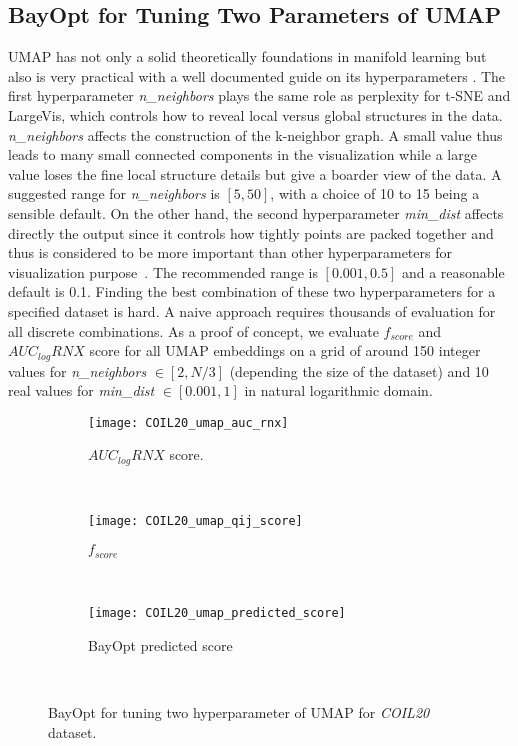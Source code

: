 \subsection{BayOpt for Tuning Two Parameters of UMAP}\label{sec:result:bo:umap}

UMAP has not only a solid theoretically foundations in manifold learning but also is very practical with a well documented guide on its hyperparameters \cite{mcinnes2018umap-software}.
The first hyperparameter \emph{n\_neighbors} plays the same role as perplexity for t-SNE and LargeVis, which controls how to reveal local versus global structures in the data.
\emph{n\_neighbors} affects the construction of the k-neighbor graph.
A small value thus leads to many small connected components in the visualization while a large value loses the fine local structure details but give a boarder view of the data.
A suggested range for \emph{n\_neighbors} is $[5, 50]$, with a choice of 10 to 15 being a sensible default.
On the other hand, the second hyperparameter \emph{min\_dist} affects directly the output since it controls how tightly points are packed together and thus is considered to be more important than other hyperparameters for visualization purpose~\cite[Sec.4.3]{mcinnes2018umap}.
The recommended range is $[0.001, 0.5]$ and a reasonable default is 0.1.
Finding the best combination of these two hyperparameters for a specified dataset is hard.
A naive approach requires thousands of evaluation for all discrete combinations.
As a proof of concept, we evaluate $f_{score}$ and $AUC_{log}RNX$ score for all UMAP embeddings on a grid of around 150 integer values for \emph{n\_neighbors} $\in [2, N/3]$ (depending the size of the dataset) and 10 real values for \emph{min\_dist} $\in [0.001, 1]$ in natural logarithmic domain.

\begin{figure}%
    \begin{subfigure}[b]{.76\linewidth}
        \texttt{[image: COIL20\_umap\_auc\_rnx]}
        \caption{$AUC_{log}RNX$ score.}
        \label{fig:bo:umap:COIL20:rnx}
    \end{subfigure}
    ~
    \begin{subfigure}[b]{.76\linewidth}
        \texttt{[image: COIL20\_umap\_qij\_score]}
        \caption{$f_{score}$}
        \label{fig:bo:umap:COIL20:fscore}
    \end{subfigure}
    ~
    \begin{subfigure}[b]{.98\linewidth}
        \centering
        \texttt{[image: COIL20\_umap\_predicted\_score]}
        \caption{BayOpt predicted score}
        \label{fig:bo:umap:COIL20:prediction}
    \end{subfigure}
    ~
    \caption{BayOpt for tuning two hyperparameter of UMAP for \emph{COIL20} dataset.}
    \label{fig:bo:umap:COIL20}
\end{figure}

